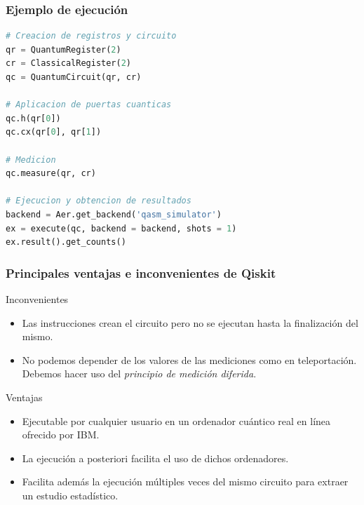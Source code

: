 \documentclass{beamer}
\begin{document}
\begin{frame}[fragile]
	\frametitle{Ejemplo de ejecución}
\begin{lstlisting}[language=Python]
# Creacion de registros y circuito
qr = QuantumRegister(2)
cr = ClassicalRegister(2)
qc = QuantumCircuit(qr, cr)

# Aplicacion de puertas cuanticas
qc.h(qr[0])
qc.cx(qr[0], qr[1])

# Medicion
qc.measure(qr, cr)

# Ejecucion y obtencion de resultados
backend = Aer.get_backend('qasm_simulator')
ex = execute(qc, backend = backend, shots = 1)
ex.result().get_counts()

\end{lstlisting}	
\end{frame}

\begin{frame}
	\frametitle{Principales ventajas e inconvenientes de Qiskit}
	\begin{block}{Inconvenientes}
		\begin{itemize}
 		\item Las instrucciones crean el circuito pero no se ejecutan hasta la finalización del mismo.
 		\item No podemos depender de los valores de las mediciones como en teleportación. Debemos hacer uso del \emph{principio de medición diferida}.
		\end{itemize}
	\end{block}
	
	\begin{block}{Ventajas}
		\begin{itemize}
		\item Ejecutable por cualquier usuario en un ordenador cuántico real en línea ofrecido por IBM.
 		\item La ejecución a posteriori facilita el uso de dichos ordenadores.
 		\item Facilita además la ejecución múltiples veces del mismo circuito para extraer un estudio estadístico.
		\end{itemize}
	\end{block}
	
\end{frame}
\end{document}
